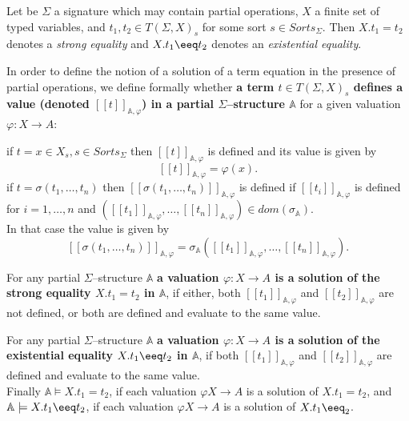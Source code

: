 \documentclass[landscape, autoslides, light]{mmiss}
\newcommand{\ekl}{[\![}
\newcommand{\ekr}{]\!]}
\begin{document}
\begin{Package}[Label={FSDPT}, Title={Formal Specification of Data and Process Types}, ShortTitle={FSDPT}, Authors={Horst Reichel}, Date={February 2003}, LevelOfDetail=Lecture, Language=en-GB]
\begin{Section}[Title={Initial Algebras as Data Types}, Label={section3}]
\begin{Section}[Title={Partial Constructors}, Label={section3_5}]
\begin{Paragraph}[Label=Paragraph73]
\end{Paragraph}
\begin{Paragraph}[Title={strong and existential equalities}, Label=Paragraph74]
\small
\begin{Definition}[Title = {Initial Algebras as Data Types}, Label = {Definition3}]
Let be $\Sigma$ a signature which may contain partial operations,
$X$  a finite set of typed variables, and $t_1, t_2 \in T(\Sigma,
X)_s $ for some sort $s \in Sorts_{\Sigma}$. Then $X . t_1 = t_2$
denotes a \emph{strong equality} and $X . t_1 \eeq t_2$ denotes an
\emph{existential equality}.


In order to define the notion of a solution of a term equation in
the presence of partial operations, we define formally whether
\textbf{a term $t \in T(\Sigma, X)_s$ defines a value (denoted
$\ekl t \ekr_{ \mathbb{A}, \varphi}$) in a partial
$\Sigma$--structure $ \mathbb{A}$} for a given valuation $\varphi
: X \to A$:
\begin{List}[ListType=enumeration]
  \ListItem if $t= x \in X_s, s \in Sorts_{\Sigma}$ then  $\ekl t \ekr_{
  \mathbb{A}, \varphi}$ is defined and its value is given by $$\ekl t
  \ekr_{\mathbb{A}, \varphi} = \varphi(x).$$ \pause
  \ListItem if $t = \sigma (t_1, \ldots , t_n)$ then $\ekl \sigma (t_1, \ldots ,
  t_n) \ekr_{ \mathbb{A}, \varphi}$ is defined if $\ekl t_i \ekr_{\mathbb{A},
  \varphi}$ is defined for $i = 1, \ldots , n$ and $(\ekl t_1
  \ekr_{\mathbb{A}, \varphi}, \ldots, \ekl t_n \ekr_{\mathbb{A},
  \varphi}) \in dom(\sigma_{ \mathbb{A}})$. \\ In that case the value
  is given by $$\ekl \sigma (t_1, \ldots ,
  t_n) \ekr_{ \mathbb{A}, \varphi} = \sigma_{ \mathbb{A}}(\ekl t_1
  \ekr_{\mathbb{A}, \varphi}, \ldots, \ekl t_n \ekr_{\mathbb{A},
  \varphi}).$$
\end{List}

For any partial $\Sigma$--structure $ \mathbb{A}$ \textbf{a
valuation $\varphi : X \to A$ is a solution of the strong equality
$X . t_1 = t_2$ in $ \mathbb{A}$}, if either, both $\ekl t_1
\ekr_{\mathbb{A},\varphi} $ and $\ekl t_2
\ekr_{\mathbb{A},\varphi} $ are not defined, or both are defined
and evaluate to the same value.

For any partial $\Sigma$--structure $ \mathbb{A}$ \textbf{a
valuation $\varphi : X \to A$ is a solution of the existential
equality $X . t_1 \eeq t_2$ in $ \mathbb{A}$}, if  both $\ekl t_1
\ekr_{\mathbb{A},\varphi} $ and $\ekl t_2
\ekr_{\mathbb{A},\varphi} $  are defined and evaluate to the same
value.\\
 Finally $ \mathbb{A} \models X . t_1 = t_2$, if each valuation
 $\varphi X \to A$ is a solution of $X . t_1 = t_2$, and
$ \mathbb{A} \models X . t_1 \eeq t_2$, if each valuation
 $\varphi X \to A$ is a solution of $X . t_1 \eeq_2$.


\end{Definition}
\end{Paragraph}
\end{Section}
\end{Section}
\end{Package}
\end{document}
